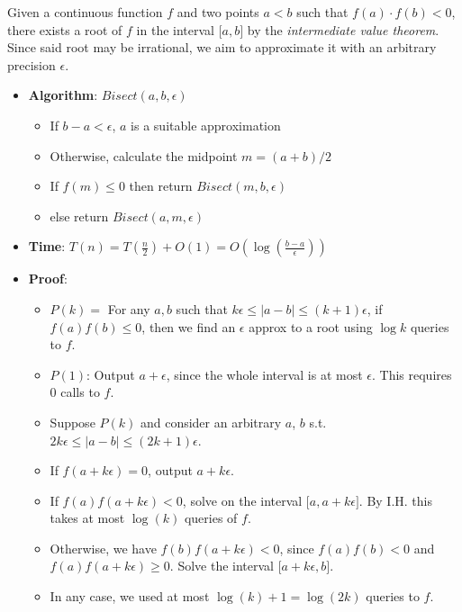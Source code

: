 \documentclass[10pt,landscape,a4paper]{article}
\begin{document}
\begin{multicols*}{3}
Given a continuous function $f$ and two points $a < b$ such that $f(a) \cdot f(b) < 0$, there exists a root of $f$ in the interval $\lbrack  a, b  \rbrack$ by the \textit{intermediate value theorem}. Since said root may be irrational, we aim to approximate it with an arbitrary precision $\epsilon$.

\begin{itemize}
    \item \textbf{Algorithm}: $Bisect(a, b, \epsilon)$
    \begin{itemize}
        \item If $b - a < \epsilon$, $a$ is a suitable approximation
        \item Otherwise, calculate the midpoint $m = (a + b)/2$
        \item If $f(m) \le 0$ then return $Bisect(m, b, \epsilon)$
        \item else return $Bisect(a, m, \epsilon)$
    \end{itemize}
    \item \textbf{Time}: $T(n) = T(\frac{n}{2}) + O(1) = O(\log(\frac{b - a}{\epsilon}))$
    \item \textbf{Proof}:
    \begin{itemize}
        \item $P(k) =$ For any $a, b$ such that $k\epsilon \le |a - b| \le (k + 1)\epsilon$, if $f(a)f(b) \le 0$, then we find an $\epsilon$ approx to a root using $\log k$ queries to $f$.
        \item $P(1)$: Output $a + \epsilon$, since the whole interval is at most $\epsilon$. This requires $0$ calls to $f$.
        \item Suppose $P(k)$ and consider an arbitrary $a$, $b$ s.t. $2k\epsilon \le |a - b| \le (2k + 1)\epsilon$.
        \item If $f(a + k\epsilon) = 0$, output $a + k\epsilon$.
        \item If $f(a)f(a + k\epsilon) < 0$, solve on the interval $\lbrack  a, a + k\epsilon  \rbrack$. By I.H. this takes at most $\log(k)$ queries of $f$.
        \item Otherwise, we have $f(b)f(a + k\epsilon) < 0$, since $f(a)f(b) < 0$ and $f(a)f(a + k\epsilon) \ge 0$. Solve the interval $\lbrack  a + k\epsilon, b  \rbrack$.
        \item In any case, we used at most $\log(k) + 1 = \log(2k)$ queries to $f$.
    \end{itemize}
\end{itemize}


\end{multicols*}
\end{document}
